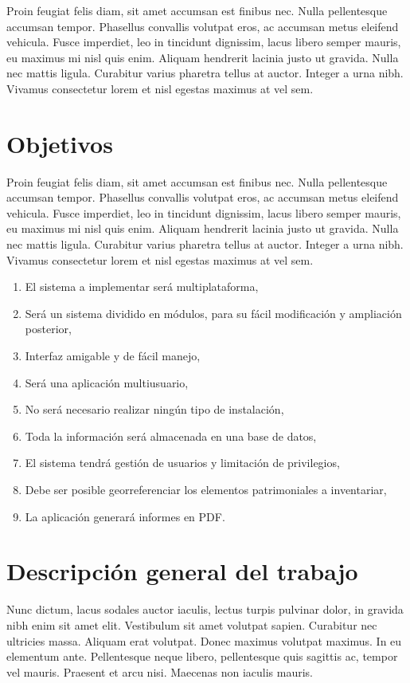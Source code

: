 Proin feugiat felis diam, sit amet accumsan est finibus nec. Nulla pellentesque
accumsan tempor. Phasellus convallis volutpat eros, ac accumsan metus eleifend
vehicula. Fusce imperdiet, leo in tincidunt dignissim, lacus libero semper
mauris, eu maximus mi nisl quis enim. Aliquam hendrerit lacinia justo ut
gravida. Nulla nec mattis ligula. Curabitur varius pharetra tellus at auctor.
Integer a urna nibh. Vivamus consectetur lorem et nisl egestas maximus at vel
sem.

\section{Objetivos}

Proin feugiat felis diam, sit amet accumsan est finibus nec. Nulla pellentesque
accumsan tempor. Phasellus convallis volutpat eros, ac accumsan metus eleifend
vehicula. Fusce imperdiet, leo in tincidunt dignissim, lacus libero semper
mauris, eu maximus mi nisl quis enim. Aliquam hendrerit lacinia justo ut
gravida. Nulla nec mattis ligula. Curabitur varius pharetra tellus at auctor.
Integer a urna nibh. Vivamus consectetur lorem et nisl egestas maximus at vel
sem.

\begin{enumerate}
    \item El sistema a implementar será multiplataforma,
    \item Será un sistema dividido en módulos, para su fácil modificación y ampliación posterior,
    \item Interfaz amigable y de fácil manejo,
    \item Será una aplicación multiusuario,
    \item No será necesario realizar ningún tipo de instalación,
    \item Toda la información será almacenada en una base de datos,
    \item El sistema tendrá gestión de usuarios y limitación de privilegios,
    \item Debe ser posible georreferenciar los elementos patrimoniales a inventariar,
    \item La aplicación generará informes en PDF.
\end{enumerate}

\section{Descripción general del trabajo}

Nunc dictum, lacus sodales auctor iaculis, lectus turpis pulvinar dolor, in
gravida nibh enim sit amet elit. Vestibulum sit amet volutpat sapien. Curabitur
nec ultricies massa. Aliquam erat volutpat. Donec maximus volutpat maximus. In
eu elementum ante. Pellentesque neque libero, pellentesque quis sagittis ac,
tempor vel mauris. Praesent et arcu nisi. Maecenas non iaculis mauris.
 
